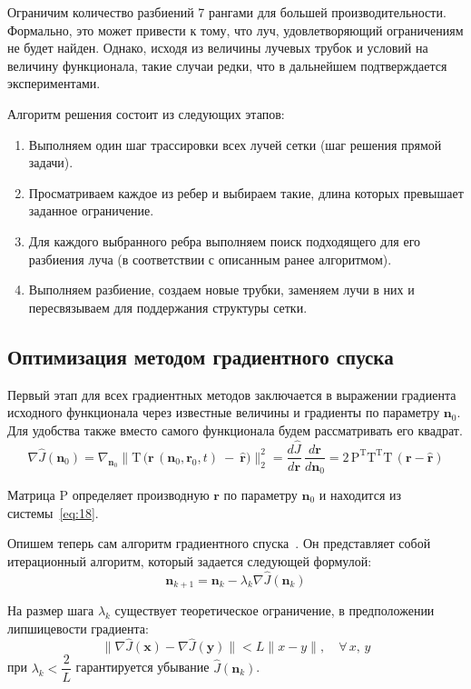 \documentclass[12pt, cleqn, a4paper]{article}
\newcommand{\bfv}[1]{\mathbf{#1}}
\newcommand{\T}[1]{#1^\mathrm{T}}
\newcommand{\matr}[1]{\mathrm{#1}}
\newcommand{\hr}{\hat{\bfv{r}}}
\begin{document}
Ограничим количество разбиений 7 рангами для большей производительности. Формально, это может привести к тому, что луч, удовлетворяющий ограничениям не будет найден. Однако, исходя из величины лучевых трубок и условий на величину функционала, такие случаи редки, что в дальнейшем подтверждается экспериментами.  

Алгоритм решения состоит из следующих этапов:
\begin{enumerate} 
    \item Выполняем один шаг трассировки всех лучей сетки (шаг решения прямой задачи).
    \item Просматриваем каждое из ребер и выбираем такие, длина которых превышает заданное ограничение.
    \item Для каждого выбранного ребра выполняем поиск подходящего для его разбиения луча (в соответствии с описанным ранее алгоритмом).
    \item Выполняем разбиение, создаем новые трубки, заменяем лучи в них и пересвязываем для поддержания структуры сетки.
\end{enumerate}

\subsection{Оптимизация методом градиентного спуска}
Первый этап для всех градиентных методов заключается в выражении градиента исходного функционала через известные величины и градиенты по параметру $\bfv{n}_0$. Для удобства также вместо самого функционала будем рассматривать его квадрат. 
\begin{equation} \label{eq:31}
\nabla \hat{J}(\bfv{n}_0) = \nabla_{\bfv{n}_0}\big\|\matr{T}\,\big(\bfv{r}\,(\bfv{n}_0, \bfv{r}_0, t) \ - \ \hr \big)\big\|^2_2 =\frac{d\hat{J}}{d\bfv{r}}\,\frac{d\bfv{r}}{d\bfv{n}_0} = 2\,\T{\matr{P}}\T{\matr{T}}\matr{T}\,(\bfv{r} - \hr)
\end{equation}

Матрица $\matr{P}$ определяет производную $\bfv{r}$ по параметру $\bfv{n}_0$ и находится из системы~\eqref{eq:18}.

Опишем теперь сам алгоритм градиентного спуска~\cite{vasiliev2002methods}. Он представляет собой итерационный алгоритм, который задается следующей формулой:
\begin{equation} \label{eq:32}
\bfv{n}_{k+1} = \bfv{n}_k - \lambda_k \nabla \hat{J}(\bfv{n}_k)
\end{equation}

На размер шага $\lambda_k$ существует теоретическое ограничение, в предположении липшицевости градиента:
\begin{equation*}
\| \nabla \hat{J}(\bfv{x}) -  \nabla \hat{J}(\bfv{y})\| < L\|x - y\|, \quad \forall \, x,\,y
\end{equation*}
 при $\lambda_k < \dfrac{2}{L}$ гарантируется убывание $\hat{J}(\bfv{n}_k)$.
\end{document}

